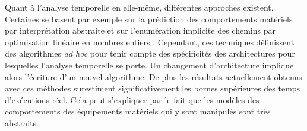   Quant à l'analyse temporelle en elle-même, différentes approches
  existent. Certaines se basent par exemple sur la prédiction des comportements
  matériels par interprétation abstraite et sur l'enumération implicite des
  chemins par optimisation linéaire en nombres entiers \cite{HF04}. Cependant,
  ces techniques définissent des algorithmes \textit{ad hoc} pour tenir compte
  des spécificités des architectures pour lesquelles l'analyse temporelle se
  porte. Un changement d'architecture implique alors l'écriture d'un nouvel
  algorithme. De plus les résultats actuellement obtenus avec ces méthodes
  surestiment significativement les bornes supérieures des temps d'exécutions
  réel. Cela peut s'expliquer par le fait que les modèles des comportements des
  équipements matériels qui y sont manipulés sont très abstraits.
